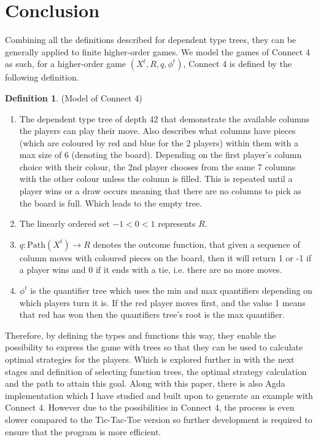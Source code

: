 \documentclass[12pt]{article}
\theoremstyle{definition}
\newtheorem{definition}{Definition}[section]
\begin{document}
\section{Conclusion}
Combining all the definitions described for dependent type trees, they can be generally applied to finite higher-order games. We model the games of Connect 4 as such, for a higher-order game $(X^t, R, q, \phi^t)$, Connect 4 is defined by the following definition.
\begin{definition}(Model of Connect 4)
\begin{enumerate}
\item The dependent type tree of depth 42 that demonstrate the available columns the players can play their move. Also describes what columns have pieces (which are coloured by red and blue for the 2 players) within them with a max size of 6 (denoting the board). Depending on the first player's column choice with their colour, the 2nd player chooses from the same 7 columns with the other colour unless the column is filled. This is repeated until a player wins or a draw occurs meaning that there are no columns to pick as the board is full. Which leads to the empty tree.
\item The linearly ordered set $-1 < 0 < 1$ represents $R$.
\item $q : \text{Path}(X^t) \rightarrow R$ denotes the outcome function, that given a sequence of column moves with coloured pieces on the board, then it will return 1 or -1 if a player wins and 0 if it ends with a tie, i.e. there are no more moves.
\item $\phi^t$ is the quantifier tree which uses the min and max quantifiers depending on which players turn it is. If the red player moves first, and the value 1 means that red has won then the quantifiers tree's root is the max quantifier.
\end{enumerate}
\end{definition}

Therefore, by defining the types and functions this way, they enable the possibility to express the game with trees so that they can be used to calculate optimal strategies for the players. Which is explored further in \cite{escardo2022higher} with the next stages and definition of selecting function trees, the optimal strategy calculation and the path to attain this goal. Along with this paper, there is also Agda implementation which I have studied and built upon to generate an example with Connect 4. However due to the possibilities in Connect 4, the process is even slower compared to the Tic-Tac-Toe version so further development is required to ensure that the program is more efficient.
\end{document}
